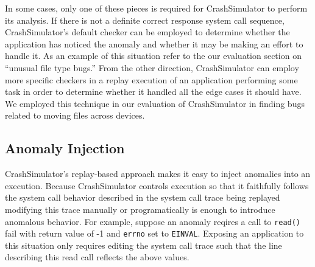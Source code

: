     In some cases, only one of these pieces is required for CrashSimulator to
    perform its analysis.  If there is not a definite correct response system
    call sequence, CrashSimulator's default checker can be employed to determine
    whether the application has noticed the anomaly and whether it may be making
    an effort to handle it.  As an example of this situation refer to the our
    evaluation section on ``unusual file type bugs.''  From the other direction,
    CrashSimulator can employ more specific checkers in a replay execution of an
    application performing some task in order to determine whether it handled
    all the edge cases it should have.  We employed this technique in our
    evaluation of CrashSimulator in finding bugs related to moving files across
    devices.
    
    \subsection{Anomaly Injection}

    CrashSimulator's replay-based approach makes it easy to inject anomalies
    into an execution.  
    Because CrashSimulator controls execution so that it faithfully
    follows the system call behavior described in the system call trace being
    replayed modifying this trace manually or programatically is enough to
    introduce anomalous behavior.  For example, suppose an anomaly reqires a
    call to {\tt read()} fail with return value of -1 and {\tt errno} set to
    {\tt EINVAL}.  Exposing an application to this situation only requires
    editing the system call trace such that the line describing this read call
    reflects the above values.



